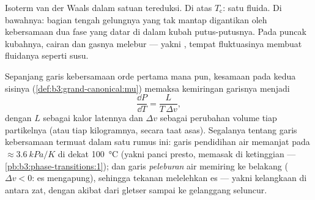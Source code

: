 \begin{omfigure}

{\small Isoterm van der Waals dalam satuan tereduksi. Di atas
$T_{\text{c}}$: satu fluida. Di bawahnya: bagian tengah gelungnya yang
tak mantap digantikan oleh kebersamaan dua fase yang datar di dalam kubah
putus-putusnya. Pada puncak kubahnya, cairan dan gasnya melebur --- yakni
, tempat fluktuasinya membuat fluidanya seperti susu.}
\end{omfigure}

\begin{proposition}\label{prop:b3:phase-transitions:clapeyron}
Sepanjang garis kebersamaan orde pertama mana pun, kesamaan  pada kedua sisinya
(\cref{def:b3:grand-canonical:mu}) memaksa kemiringan garisnya menjadi
\[
\frac{\dd P}{\dd T} = \frac{L}{T\,\Delta v} ,
\]
dengan $L$ sebagai kalor latennya dan $\Delta v$ sebagai perubahan volume
tiap partikelnya (atau tiap kilogramnya, secara taat asas). Segalanya
tentang garis kebersamaan termuat dalam satu rumus ini: garis pendidihan
air memanjat pada $\approx\qty{3.6}{kPa/K}$ di dekat \qty{100}{\celsius}
(yakni panci presto, memasak di ketinggian ---
\cref{pb:b3:phase-transitions:1}); dan garis \emph{peleburan} air
memiring ke belakang ($\Delta v < 0$: es mengapung), sehingga tekanan
melelehkan es --- yakni kelangkaan di antara zat, dengan akibat dari
gletser sampai ke gelanggang seluncur.
\end{proposition}


